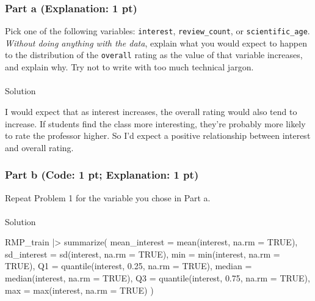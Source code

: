 \documentclass[
  letterpaper,
  DIV=11,
  numbers=noendperiod]{scrartcl}
\makeatletter
\let\oldparagraph\paragraph
\renewcommand{\paragraph}{
    \@ifstar
      \xxxParagraphStar
      \xxxParagraphNoStar
  }
\newcommand{\xxxParagraphStar}[1]{\oldparagraph*{#1}\mbox{}}
\newcommand{\xxxParagraphNoStar}[1]{\oldparagraph{#1}\mbox{}}
\newenvironment{Shaded}{\begin{snugshade}}{\end{snugshade}}
\newcommand{\AttributeTok}[1]{\textcolor[rgb]{0.40,0.45,0.13}{#1}}
\newcommand{\ConstantTok}[1]{\textcolor[rgb]{0.56,0.35,0.01}{#1}}
\newcommand{\FloatTok}[1]{\textcolor[rgb]{0.68,0.00,0.00}{#1}}
\newcommand{\FunctionTok}[1]{\textcolor[rgb]{0.28,0.35,0.67}{#1}}
\newcommand{\NormalTok}[1]{\textcolor[rgb]{0.00,0.23,0.31}{#1}}
\newcommand{\SpecialCharTok}[1]{\textcolor[rgb]{0.37,0.37,0.37}{#1}}
\makeatother
\begin{document}
\subsubsection{Part a (Explanation: 1
pt)}\label{part-a-explanation-1-pt-1}

Pick one of the following variables: \texttt{interest},
\texttt{review\_count}, or \texttt{scientific\_age}. \emph{Without doing
anything with the data}, explain what you would expect to happen to the
distribution of the \texttt{overall} rating as the value of that
variable increases, and explain why. Try not to write with too much
technical jargon.

\paragraph{Solution}\label{solution-4}

I would expect that as interest increases, the overall rating would also
tend to increase. If students find the class more interesting, they're
probably more likely to rate the professor higher. So I'd expect a
positive relationship between interest and overall rating.

\subsubsection{Part b (Code: 1 pt; Explanation: 1
pt)}\label{part-b-code-1-pt-explanation-1-pt}

Repeat Problem 1 for the variable you chose in Part a.

\paragraph{Solution}\label{solution-5}

\begin{Shaded}
\begin{Highlighting}[]
\NormalTok{RMP\_train }\SpecialCharTok{|\textgreater{}}
  \FunctionTok{summarize}\NormalTok{(}
    \AttributeTok{mean\_interest =} \FunctionTok{mean}\NormalTok{(interest, }\AttributeTok{na.rm =} \ConstantTok{TRUE}\NormalTok{),}
    \AttributeTok{sd\_interest   =} \FunctionTok{sd}\NormalTok{(interest, }\AttributeTok{na.rm =} \ConstantTok{TRUE}\NormalTok{),}
    \AttributeTok{min           =} \FunctionTok{min}\NormalTok{(interest, }\AttributeTok{na.rm =} \ConstantTok{TRUE}\NormalTok{),}
    \AttributeTok{Q1            =} \FunctionTok{quantile}\NormalTok{(interest, }\FloatTok{0.25}\NormalTok{, }\AttributeTok{na.rm =} \ConstantTok{TRUE}\NormalTok{),}
    \AttributeTok{median        =} \FunctionTok{median}\NormalTok{(interest, }\AttributeTok{na.rm =} \ConstantTok{TRUE}\NormalTok{),}
    \AttributeTok{Q3            =} \FunctionTok{quantile}\NormalTok{(interest, }\FloatTok{0.75}\NormalTok{, }\AttributeTok{na.rm =} \ConstantTok{TRUE}\NormalTok{),}
    \AttributeTok{max           =} \FunctionTok{max}\NormalTok{(interest, }\AttributeTok{na.rm =} \ConstantTok{TRUE}\NormalTok{)}
\NormalTok{  )}
\end{Highlighting}
\end{Shaded}
\end{document}
